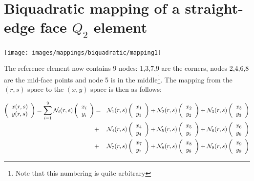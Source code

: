 \section{Biquadratic mapping of a straight-edge face $Q_2$ element }

\begin{center}
\texttt{[image: images/mappings/biquadratic/mapping1]}
\end{center}

The reference element now contains 9 nodes: 1,3,7,9 are the corners, nodes
2,4,6,8 are the mid-face points and node 5 is in the middle\footnote{Note that 
this numbering is quite arbitrary}.
The mapping from the $(r,s)$ space to the $(x,y)$ space is then as follows:

\begin{eqnarray}
\left(\begin{array}{c}
x(r,s) \\ y(r,s)
\end{array}\right)
=\sum_{i=1}^9 
{\mathcal{N}}_i(r,s)\left(\begin{array}{c} x_i \\ y_i \end{array}\right)
&=&
{\mathcal{N}}_1(r,s)\left(\begin{array}{c} x_1 \\ y_1 \end{array}\right)
+
{\mathcal{N}}_2(r,s)\left(\begin{array}{c} x_2 \\ y_2 \end{array}\right)
+
{\mathcal{N}}_3(r,s)\left(\begin{array}{c} x_3 \\ y_3 \end{array}\right)\nonumber\\
&+&
{\mathcal{N}}_4(r,s)\left(\begin{array}{c} x_4 \\ y_4 \end{array}\right)
+
{\mathcal{N}}_5(r,s)\left(\begin{array}{c} x_5 \\ y_5 \end{array}\right)
+
{\mathcal{N}}_6(r,s)\left(\begin{array}{c} x_6 \\ y_6 \end{array}\right)\nonumber\\
&+&
{\mathcal{N}}_7(r,s)\left(\begin{array}{c} x_7 \\ y_7 \end{array}\right)
+
{\mathcal{N}}_8(r,s)\left(\begin{array}{c} x_8 \\ y_8 \end{array}\right) 
+
{\mathcal{N}}_9(r,s)\left(\begin{array}{c} x_9 \\ y_9 \end{array}\right) \nonumber
\end{eqnarray}
